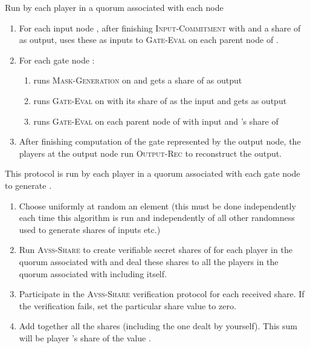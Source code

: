 \documentclass[10pt]{llncs}
\newcommand{\vssSh}{\textsc{Avss-Share}\xspace}
\newcommand{\ic}{\textsc{Input-Commitment}\xspace}
\newcommand{\ce}{\textsc{Circuit-Eval}\xspace}
\newcommand{\gm}{\textsc{Mask-Generation}\xspace}
\newcommand{\gcomp}{\textsc{Gate-Eval}\xspace}
\newcommand{\outrec}{\textsc{Output-Rec}\xspace}
\begin{document}
\begin{algorithm}
\caption{\ce}\label{alg:ce}
Run by each player  in a quorum associated with each node 
\begin{enumerate}
\item For each input node , after finishing \ic with  and a share of  as output,  uses these as inputs to \gcomp on each parent node of .\item For each gate node :
\begin{enumerate}
\item  runs \gm on  and gets a share of  as output
\item  runs \gcomp on  with its share of  as the input and gets  as output
\item  runs \gcomp on each parent node of  with input  and 's share of 
\end{enumerate}
\item After finishing computation of the gate represented by the output node, the players at the output node run \outrec to reconstruct the output.
\end{enumerate}
\end{algorithm}

\begin{algorithm}
\caption{\gm}\label{alg:rand}
This protocol is run by each player  in a quorum associated with each gate node  to generate .
\begin{enumerate}
\item Choose uniformly at random an element  (this must be done independently each time this algorithm is run and independently of all other randomness used to generate shares of inputs etc.)
\item Run \vssSh to create verifiable secret shares of  for each player in the quorum associated with  and deal these shares to all the players in the quorum associated with  including itself.
\item Participate in the \vssSh verification protocol for each received share. If the verification fails, set the particular share value to zero. 
\item Add together all the shares (including the one dealt by yourself).  This sum will be player 's share of the value . 
\end{enumerate}
\end{algorithm}
\end{document}
